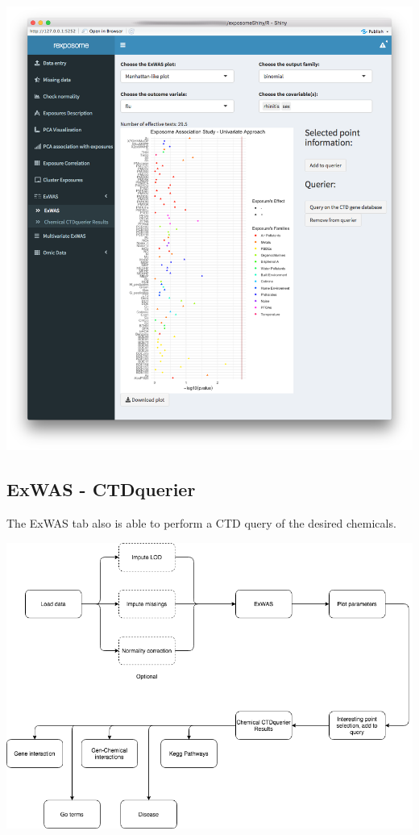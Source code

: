 \documentclass[
]{book}
\begin{document}
\includegraphics{images/analysis7_2.png}

\hypertarget{exwas---ctdquerier}{%
\subsection{ExWAS - CTDquerier}\label{exwas---ctdquerier}}

The ExWAS tab also is able to perform a CTD query of the desired chemicals.

\includegraphics{images/analysis7_3.png}
\end{document}
